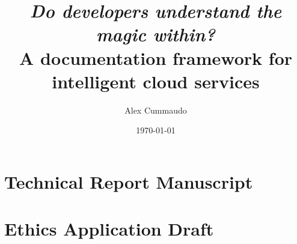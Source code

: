 \documentclass[twoside,12pt,titlepage]{book}
\title{\textit{Do developers understand the magic within?}\\
    A documentation framework for intelligent cloud services
}
\author{Alex Cummaudo}
\date{\today}
\begin{document}
\frontmatter


%
%


\mainmatter




%


\appendix
\chapter{Technical Report Manuscript}
\label{appx:tech-report}
\cleardoublepage


\chapter{Ethics Application Draft}
\label{appx:ethics}
\cleardoublepage
\end{document}
